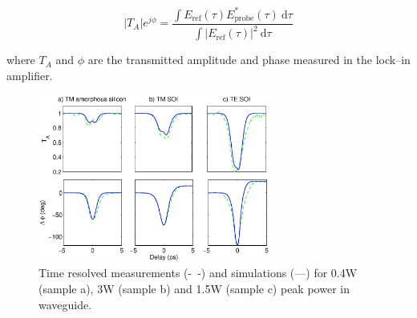 \documentclass[10pt,letterpaper]{article}
\begin{document}


\begin{equation}
        |T_{A}|e^{j\phi} =
        \frac{\int E_{\mathrm{ref}}(\tau) E^*_{\mathrm{probe}}(\tau) ~ \mathrm{d}\tau}
        {\int |E_{\mathrm{ref}}(\tau)|^2~\mathrm{d}\tau}
\end{equation}


where $T_A$ and $\phi$ are the transmitted amplitude and phase measured in the lock--in amplifier.

\begin{figure}[htb]
    \centering
    \includegraphics[width=0.68\textwidth]{timeRes_simulations_AmorfoTm10mmP13b_0p5w_SOI_2w__}
    \caption{Time resolved measurements (-~-) and simulations (---) for 0.4W (sample a), 3W (sample b) and 1.5W (sample c) peak power in waveguide.}
    \label{fig:timeResolvesSimulations}
\end{figure}
\end{document}
